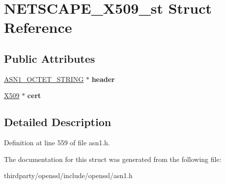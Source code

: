 \hypertarget{struct_n_e_t_s_c_a_p_e___x509__st}{}\section{N\+E\+T\+S\+C\+A\+P\+E\+\_\+\+X509\+\_\+st Struct Reference}
\label{struct_n_e_t_s_c_a_p_e___x509__st}
\subsection*{Public Attributes}
\begin{DoxyCompactItemize}
\item 
\mbox{\label{struct_n_e_t_s_c_a_p_e___x509__st_a00f5f31a882f9ee420d1a3bd2beebedd}} 
\hyperlink{structasn1__string__st}{A\+S\+N1\+\_\+\+O\+C\+T\+E\+T\+\_\+\+S\+T\+R\+I\+NG} $\ast$ {\bfseries header}
\item 
\mbox{\label{struct_n_e_t_s_c_a_p_e___x509__st_ae73d9f6791b788f7c724b89f715d3d76}} 
\hyperlink{structx509__st}{X509} $\ast$ {\bfseries cert}
\end{DoxyCompactItemize}


\subsection{Detailed Description}


Definition at line 559 of file asn1.\+h.



The documentation for this struct was generated from the following file\+:\begin{DoxyCompactItemize}
\item 
thirdparty/openssl/include/openssl/asn1.\+h\end{DoxyCompactItemize}
